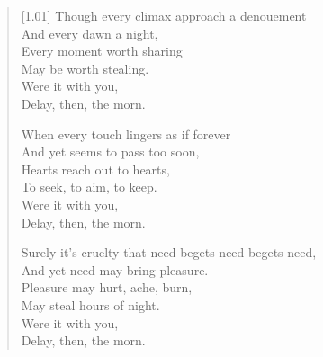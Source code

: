 \begin{verse}[1.01\textwidth]
  Though every climax approach a denouement\\
  And every dawn a night,\\
  Every moment worth sharing\\
  May be worth stealing.\\
  \vin Were it with you,\\
  \vin Delay, then, the morn.

  When every touch lingers as if forever\\
  And yet seems to pass too soon,\\
  Hearts reach out to hearts,\\
  To seek, to aim, to keep.\\
  \vin Were it with you,\\
  \vin Delay, then, the morn.

  Surely it's cruelty that need begets need begets need,\\
  And yet need may bring pleasure.\\
  Pleasure may hurt, ache, burn,\\
  May steal hours of night.\\
  \vin Were it with you,\\
  \vin Delay, then, the morn.
\end{verse}
